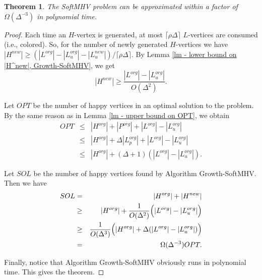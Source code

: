 \documentclass[11pt]{article}
\newtheorem{theorem}{Theorem}[section]
\newcommand{\qed}{\vrule height4pt width4pt depth2pt}
\begin{document}
\begin{theorem}
The SoftMHV problem can be approximated within a factor of
$\Omega(\Delta^{-3})$ in polynomial time.
\end{theorem}
\begin{proof}
Each time an $H$-vertex is generated, at most $\lceil \rho \Delta \rceil$
$L$-vertices are consumed (i.e., colored).
So, for the number of newly generated $H$-vertices we have
$|H^{new}| \geq (|L^{org}| - |L_{u}^{org}| - |L_{u}^{new}|) / \lceil \rho \Delta \rceil$.
By Lemma \ref{lm - lower bound on |H^new|, Growth-SoftMHV}, we get
\begin{equation}
|H^{new}| \geq \frac{|L^{org}| - |L_{u}^{org}|}{O(\Delta^2)}.
\nonumber
\end{equation}

Let $OPT$ be the number of happy vertices in an optimal solution to
the problem. By the same reason as in Lemma \ref{lm - upper bound on OPT},
we obtain
\begin{eqnarray}
OPT &\leq& |H^{org}| + |P^{org}| + |L^{org}| - |L_{u}^{org}| \nonumber \\
&\leq& |H^{org}| + \Delta |L_p^{org}| + |L^{org}| - |L_{u}^{org}| \nonumber \\
&\leq& |H^{org}| + (\Delta+1) (|L^{org}| - |L_{u}^{org}|). \nonumber
\end{eqnarray}

Let $SOL$ be the number of happy vertices found by Algorithm
{\sc Growth-SoftMHV}. Then we have
\begin{eqnarray}
SOL &=& |H^{org}| + |H^{new}| \nonumber \\
&\geq& |H^{org}| + \frac{1}{O(\Delta^2)}\Bigl(|L^{org}| - |L_{u}^{org}|\Bigr)
\nonumber \\
&\geq& \frac{1}{O(\Delta^3)}\Bigl(|H^{org}| + \Delta(|L^{org}| - |L_{u}^{org}|)\Bigr)
\nonumber \\
&=& \Omega(\Delta^{-3}) OPT. \nonumber
\end{eqnarray}

Finally, notice that Algorithm {\sc Growth-SoftMHV} obviously runs
in polynomial time. This gives the theorem.
\qed
\end{proof}
\end{document}
